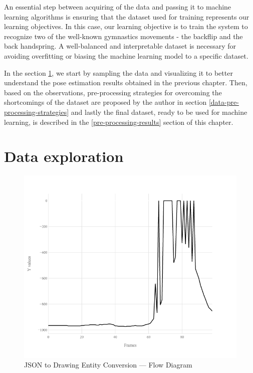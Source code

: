 An essential step between acquiring of the data and passing it to machine learning algorithms is ensuring that the dataset used for training represents our learning objectives. In this case, our learning objective is to train the system to recognize two of the well-known gymnastics movements - the backflip and the back handspring. A well-balanced and interpretable dataset is necessary for avoiding overfitting or biasing the machine learning model to a specific dataset. 

In the section \ref{data-exploration}, we start by sampling the data and visualizing it to better understand the pose estimation results obtained in the previous chapter. Then, based on the observations, pre-processing strategies for overcoming the shortcomings of the dataset are proposed by the author in section \ref{data-pre-processing-strategies} and lastly the final dataset, ready to be used for machine learning, is described in the \ref{pre-processing-results} section of this chapter.

\section{Data exploration}
\label{data-exploration}

\begin{figure}[htb]
  \centering
    \includegraphics[width=14cm]
    {images/data-preprocessing/flack-17-rasmus-l-heel-y-raw}
    \caption{JSON to Drawing Entity Conversion --- Flow Diagram}
    \label{alg-drawing}
\end{figure}


